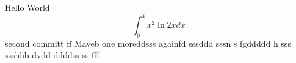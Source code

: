 \documentclass{article}
\begin{document}
Hello World
$$\int_0^4 x^2 \ln{2x}dx$$
second committ  ff
Mayeb
one moreddsss
againfd
sssddd sssn
s fgddddd h sss
ssshhb dvdd ddddss ss fff
\end{document}
